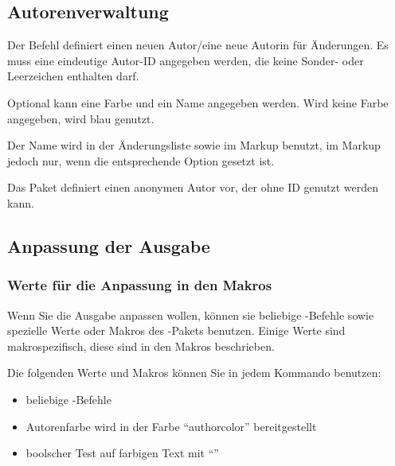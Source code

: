 



\subsection{Autorenverwaltung}
\label{sec:ui:authormanagement}



Der Befehl  definiert einen neuen Autor/eine neue Autorin für Änderungen.
Es muss eine eindeutige Autor-ID angegeben werden, die keine Sonder- oder Leerzeichen enthalten darf.

Optional kann eine Farbe und ein Name angegeben werden.
Wird keine Farbe angegeben, wird blau genutzt.

Der Name wird in der Änderungsliste sowie im Markup benutzt, im Markup jedoch nur, wenn die entsprechende Option gesetzt ist.

Das Paket definiert einen anonymen Autor vor, der ohne ID genutzt werden kann.



\subsection{Anpassung der Ausgabe}
\label{sec:ui:customizingoutput}

\localtableofcontents

\subsubsection{Werte für die Anpassung in den Makros}

Wenn Sie die Ausgabe anpassen wollen, können sie beliebige -Befehle sowie spezielle Werte oder Makros des -Pakets benutzen.
Einige Werte sind makrospezifisch, diese sind in den Makros beschrieben.

Die folgenden Werte und Makros können Sie in jedem Kommando benutzen:

\begin{itemize}
	\item beliebige -Befehle
	\item Autorenfarbe wird in der Farbe "`authorcolor"' bereitgestellt
	\item boolscher Test auf farbigen Text mit "`"'
\end{itemize}

